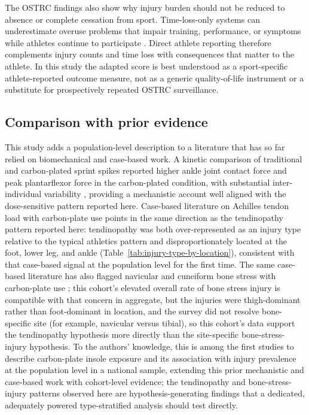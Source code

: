 The OSTRC findings also show why injury burden should not be reduced to absence or complete cessation from sport. Time-loss-only systems can underestimate overuse problems that impair training, performance, or symptoms while athletes continue to participate \citep{clarsen2013ostrc,clarsen2020ostrc}. Direct athlete reporting therefore complements injury counts and time loss with consequences that matter to the athlete. In this study the adapted score is best understood as a sport-specific athlete-reported outcome measure, not as a generic quality-of-life instrument or a substitute for prospectively repeated OSTRC surveillance.

\subsection{Comparison with prior evidence}
\label{sec:discussion-comparison}
This study adds a population-level description to a literature that has so far relied on biomechanical and case-based work. A kinetic comparison of traditional and carbon-plated sprint spikes reported higher ankle joint contact force and peak plantarflexor force in the carbon-plated condition, with substantial inter-individual variability \citep{gerlach2025aft}, providing a mechanistic account well aligned with the dose-sensitive pattern reported here. Case-based literature on Achilles tendon load with carbon-plate use \citep{tenforde2023bonestress} points in the same direction as the tendinopathy pattern reported here: tendinopathy was both over-represented as an injury type relative to the typical athletics pattern \citep{edouard2020injury} and disproportionately located at the foot, lower leg, and ankle (Table~\ref{tab:injury-type-by-location}), consistent with that case-based signal at the population level for the first time. The same case-based literature has also flagged navicular and cuneiform bone stress with carbon-plate use \citep{tenforde2023bonestress}; this cohort's elevated overall rate of bone stress injury is compatible with that concern in aggregate, but the injuries were thigh-dominant rather than foot-dominant in location, and the survey did not resolve bone-specific site (for example, navicular versus tibial), so this cohort's data support the tendinopathy hypothesis more directly than the site-specific bone-stress-injury hypothesis. To the authors' knowledge, this is among the first studies to describe carbon-plate insole exposure and its association with injury prevalence at the population level in a national sample, extending this prior mechanistic and case-based work with cohort-level evidence; the tendinopathy and bone-stress-injury patterns observed here are hypothesis-generating findings that a dedicated, adequately powered type-stratified analysis should test directly.

